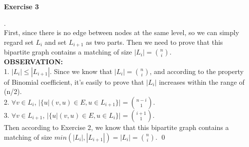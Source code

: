 \documentclass[12pt, notitlepage]{article}
\newenvironment{sol}
  {\par\vspace{3mm}\noindent{\it Solution}.}{\qed}
\begin{document}
\textbf{Exercise 3}
\begin{sol}\\
First, since there is no edge between nodes at the same level, so we can simply regard set $L_i$ and set $L_{i+1}$ as two parts. Then we need to prove that this bipartite graph contains a matching of size $|L_i|=\binom{n}{i}$.\\
\textbf{OBSERVATION:}\\
1. $|L_i|\leq |L_{i+1}|$. Since we know that $|L_i|=\binom{n}{i}$, and according to the property of Binomial coefficient, it's easily to prove that $|L_i|$ increases within the range of (n/2).\\
2. $\forall v\in L_i$, $|\{u|(v,u)\in E, u\in L_{i+1}\}|=\binom{n-i}{1}$.\\
3. $\forall v\in L_{i+1}$, $|\{u|(v,u)\in E, u\in L_i\}|=\binom{i+1}{1}$.\\
Then according to Exercise 2, we know that this bipartite graph contains a matching of size $min(|L_i|,|L_{i+1}|)=|L_i|=\binom{n}{i}$.
\end{sol}\\
\end{document}
